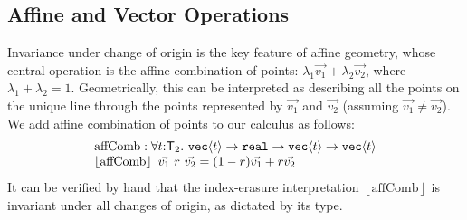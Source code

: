 \documentclass{sigplanconf}
\newcommand{\SynTransl}[1]{\mathsf{T}_#1}
\newcommand{\tyPrim}[2]{\textup{\texttt{#1}}\langle #2 \rangle}
\newcommand{\tyPrimNm}[1]{\textup{\texttt{#1}}}
\newcommand{\tmSem}[1]{\left\lfloor{#1}\right\rfloor}
\theoremstyle{examplestyle}
\theoremstyle{restatementstyle}
\begin{document}
\subsection{Affine and Vector Operations}
\label{sec:affine-vector-ops}

Invariance under change of origin is the key feature of affine
geometry, whose central operation is the affine combination of points:
$\lambda_1\vec{v_1} + \lambda_2\vec{v_2}$, where $\lambda_1 +
\lambda_2 = 1$.  Geometrically, this can be interpreted as describing
all the points on the unique line through the points represented by
$\vec{v_1}$ and $\vec{v_2}$ (assuming $\vec{v_1} \not= \vec{v_2}$).
We add affine combination of points to our calculus as
follows: %
\begin{displaymath}
  \begin{array}{l}
    \mathrm{affComb} :\forall t \mathord:
    \SynTransl{2}.\ \tyPrim{vec}{t} \to \tyPrimNm{real} \to
    \tyPrim{vec}{t} \to \tyPrim{vec}{t} \\ 
    \tmSem{\mathrm{affComb}}\ \vec{v_1}\ r\ \vec{v_2} = (1-r)\vec{v_1} +
    r\vec{v_2} 
\end{array}
\end{displaymath}
It can be verified by hand that the index-erasure interpretation %
$\tmSem{\mathrm{affComb}}$ is invariant under all changes of origin, as
dictated by its type.
\end{document}
